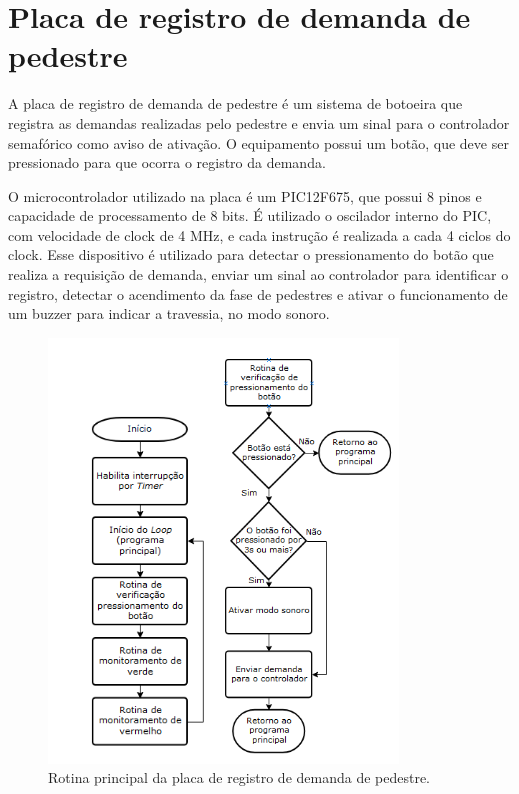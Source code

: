 \section{Placa de registro de demanda de pedestre}

A placa de registro de demanda de pedestre é um sistema de botoeira que registra as demandas realizadas pelo pedestre e envia um sinal para o controlador semafórico como aviso de ativação. O equipamento possui um botão, que deve ser pressionado para que ocorra o registro da demanda. 

O microcontrolador utilizado na placa é um PIC12F675, que possui 8 pinos e capacidade de processamento de 8 bits. É utilizado o oscilador interno do PIC, com velocidade de clock de 4 MHz, e cada instrução é realizada a cada 4 ciclos do clock. Esse dispositivo é utilizado para detectar o pressionamento do botão que realiza a requisição de demanda, enviar um sinal ao controlador para identificar o registro, detectar o acendimento da fase de pedestres e ativar o funcionamento de um buzzer para indicar a travessia, no modo sonoro. 

\begin{figure}[ht]
    \begin{center}
    \includegraphics{figuras/fluxo_bot.PNG}
    \end{center}
    \caption[Fluxograma botoeira]{Rotina principal da placa de registro de demanda de pedestre.}
    \label{fluxo_bot}
\end{figure}

